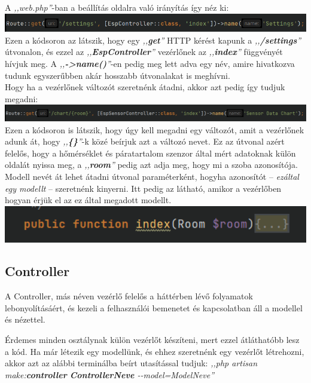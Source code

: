 \documentclass[
]{thesis-ekf}
\theoremstyle{definition}
\theoremstyle{remark}
\begin{document}
	A \emph{,,web.php''}-ban a beállítás oldalra való irányítás így néz ki:
	\\
	\includegraphics[width=1\textwidth]{./src/codes/route}
	\\
	Ezen a kódsoron az látszik, hogy egy \emph{,,\textbf{get}''} HTTP kérést kapunk a \emph{,,\textbf{/settings}''} útvonalon, és ezzel az \emph{,,\textbf{EspController}''} vezérlőnek az \emph{,,\textbf{index}''} függvényét hívjuk meg. A \emph{,,\textbf{->name()}''}-en pedig meg lett adva egy név, amire hivatkozva tudunk egyszerűbben akár hosszabb útvonalakat is meghívni.
	\\
	Hogy ha a vezérlőnek változót szeretnénk átadni, akkor azt pedig így tudjuk megadni:
	\\
	\includegraphics[width=1\textwidth]{./src/codes/route_with_var}
	Ezen a kódsoron is látszik, hogy úgy kell megadni egy változót, amit a vezérlőnek adunk át, hogy \emph{,,\textbf{\{\}}''}-k közé beírjuk azt a változó nevet. Ez az útvonal azért felelős, hogy a hőmérséklet és páratartalom szenzor által mért adatoknak külön oldalát nyissa meg, a \emph{,,\textbf{room}''} pedig azt adja meg, hogy mi a szoba azonosítója. Modell nevét át lehet átadni útvonal paraméterként, hogyha azonosítót -- \emph{ezáltal egy modellt} -- szeretnénk kinyerni.
	Itt pedig az látható, amikor a vezérlőben hogyan érjük el az ez által megadott modellt.
	\\
	\includegraphics[width=1\textwidth]{./src/codes/controller_func}
	
	\subsection{Controller}
	A Controller, más néven vezérlő felelős a háttérben lévő folyamatok lebonyolításáért, és kezeli a felhasználói bemenetet és kapcsolatban áll a modellel és nézettel.
	
	Érdemes minden osztálynak külön vezérlőt készíteni, mert ezzel átláthatóbb lesz a kód. Ha már létezik egy modellünk, és ehhez szeretnénk egy vezérlőt létrehozni, akkor azt az alábbi terminálba beírt utasítással tudjuk: \emph{,,php artisan make:\textbf{controller} \textbf{ControllerNeve} \--\--model=ModelNeve''}\cite{laravel-controller}
	
\end{document}
